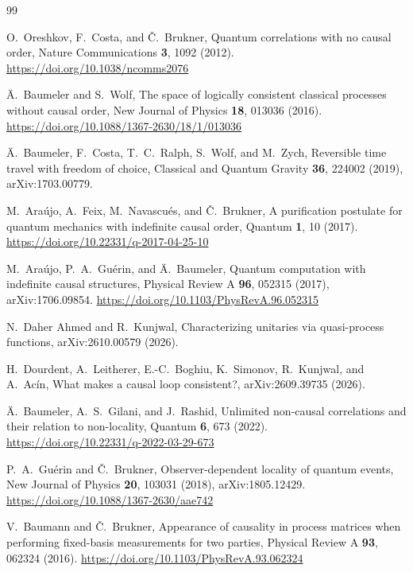\documentclass[11pt]{article}
\theoremstyle{definition}
\theoremstyle{remark}
\begin{document}
\begin{thebibliography}{99}

O.~Oreshkov, F.~Costa, and \v{C}.~Brukner,
Quantum correlations with no causal order,
Nature Communications \textbf{3}, 1092 (2012).
\url{https://doi.org/10.1038/ncomms2076}

\"A.~Baumeler and S.~Wolf,
The space of logically consistent classical processes without causal order,
New Journal of Physics \textbf{18}, 013036 (2016).
\url{https://doi.org/10.1088/1367-2630/18/1/013036}

\"A.~Baumeler, F.~Costa, T.~C.~Ralph, S.~Wolf, and M.~Zych,
Reversible time travel with freedom of choice,
Classical and Quantum Gravity \textbf{36}, 224002 (2019),
arXiv:1703.00779.

M.~Ara\'ujo, A.~Feix, M.~Navascu\'es, and \v{C}.~Brukner,
A purification postulate for quantum mechanics with indefinite causal order,
Quantum \textbf{1}, 10 (2017).
\url{https://doi.org/10.22331/q-2017-04-25-10}

M.~Ara\'ujo, P.~A.~Gu\'erin, and \"A.~Baumeler,
Quantum computation with indefinite causal structures,
Physical Review A \textbf{96}, 052315 (2017),
arXiv:1706.09854.
\url{https://doi.org/10.1103/PhysRevA.96.052315}

N.~Daher Ahmed and R.~Kunjwal,
Characterizing unitaries via quasi-process functions,
arXiv:2610.00579 (2026).

H.~Dourdent, A.~Leitherer, E.-C.~Boghiu, K.~Simonov, R.~Kunjwal, and A.~Ac\'in,
What makes a causal loop consistent?,
arXiv:2609.39735 (2026).

\"A.~Baumeler, A.~S.~Gilani, and J.~Rashid,
Unlimited non-causal correlations and their relation to non-locality,
Quantum \textbf{6}, 673 (2022).
\url{https://doi.org/10.22331/q-2022-03-29-673}

P.~A.~Gu\'erin and \v{C}.~Brukner,
Observer-dependent locality of quantum events,
New Journal of Physics \textbf{20}, 103031 (2018),
arXiv:1805.12429.
\url{https://doi.org/10.1088/1367-2630/aae742}

V.~Baumann and \v{C}.~Brukner,
Appearance of causality in process matrices when performing fixed-basis measurements for two parties,
Physical Review A \textbf{93}, 062324 (2016).
\url{https://doi.org/10.1103/PhysRevA.93.062324}


\end{thebibliography}
\end{document}
